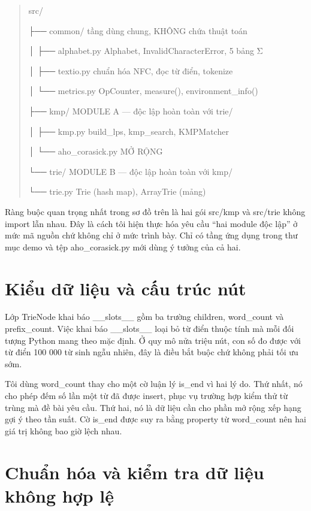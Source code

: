 \begin{quote}
src/

├── common/ tầng dùng chung, KHÔNG chứa thuật toán

│ ├── alphabet.py Alphabet, InvalidCharacterError, 5 bảng Σ

│ ├── textio.py chuẩn hóa NFC, đọc từ điển, tokenize

│ └── metrics.py OpCounter, measure(), environment\_info()

├── kmp/ MODULE A --- độc lập hoàn toàn với trie/

│ ├── kmp.py build\_lps, kmp\_search, KMPMatcher

│ └── aho\_corasick.py MỞ RỘNG

└── trie/ MODULE B --- độc lập hoàn toàn với kmp/

└── trie.py Trie (hash map), ArrayTrie (mảng)
\end{quote}

\begin{center}
\end{center}

Ràng buộc quan trọng nhất trong sơ đồ trên là hai gói src/kmp và
src/trie không import lẫn nhau. Đây là cách tôi hiện thực hóa yêu cầu
``hai module độc lập'' ở mức mã nguồn chứ không chỉ ở mức trình bày. Chỉ
có tầng ứng dụng trong thư mục demo và tệp aho\_corasick.py mới dùng ý
tưởng của cả hai.

\section{Kiểu dữ liệu và cấu trúc nút}
\label{sec:5-2}

Lớp TrieNode khai báo \_\_slots\_\_ gồm ba trường children, word\_count
và prefix\_count. Việc khai báo \_\_slots\_\_ loại bỏ từ điển thuộc tính
mà mỗi đối tượng Python mang theo mặc định. Ở quy mô nửa triệu nút, con
số đo được với từ điển 100 000 từ sinh ngẫu nhiên, đây là điều bắt buộc
chứ không phải tối ưu sớm.

Tôi dùng word\_count thay cho một cờ luận lý is\_end vì hai lý do. Thứ
nhất, nó cho phép đếm số lần một từ đã được insert, phục vụ trường hợp
kiểm thử từ trùng mà đề bài yêu cầu. Thứ hai, nó là dữ liệu cần cho phần
mở rộng xếp hạng gợi ý theo tần suất. Cờ is\_end được suy ra bằng
property từ word\_count nên hai giá trị không bao giờ lệch nhau.

\section{Chuẩn hóa và kiểm tra dữ liệu không hợp lệ}
\label{sec:5-3}

